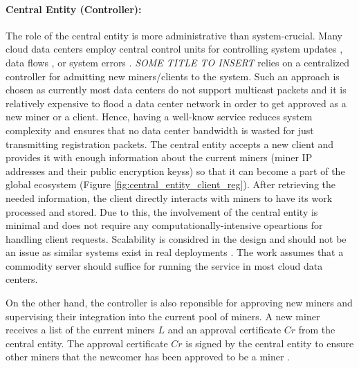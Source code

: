 \documentclass{article}
\newcommand{\projTitle}{SOME TITLE TO INSERT}
\begin{document}
\paragraph{Central Entity (Controller):} The role of the central entity is more administrative than system-crucial. Many cloud data centers employ central control units for controlling system updates \cite{microsoft-autopilot}, data flows \cite{google_jupiter}, or system errors \cite{microsoft_netpoirot}. \textit{\projTitle} relies on a centralized controller for admitting new miners/clients to the system. Such an approach is chosen as currently most data centers do not support multicast packets and it is relatively expensive to flood a data center network in order to get approved as a new miner or a client. Hence, having a well-know service reduces system complexity and ensures that no data center bandwidth is wasted for just transmitting registration packets. The central entity accepts a new client and provides it with enough information about the current miners (miner IP addresses and their public encryption keyss) so that it can become a part of the global ecosystem (Figure \ref{fig:central_entity_client_reg}). After retrieving the needed information, the client directly interacts with miners to have its work processed and stored. Due to this, the involvement of the central entity is minimal and does not require any computationally-intensive opeartions for handling client requests. Scalability is considred in the design and should not be an issue as similar systems exist in real deployments \cite{hadoop_example}. The work assumes that a commodity server should suffice for running the service in most cloud data centers.
\par


\noindent \newline On the other hand, the controller is also reponsible for approving new miners and supervising their integration into the current pool of miners. A new miner receives a list of the current miners $L$ and an approval certificate $Cr$ from the central entity.
The approval certificate $Cr$ is signed by the central entity to ensure other miners that the newcomer has been approved to be a miner \cite{public-auth-certificate}.
\end{document}
